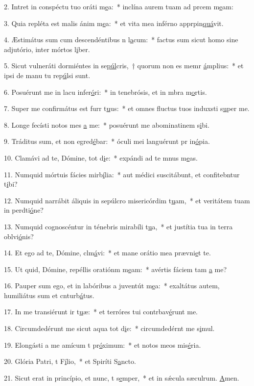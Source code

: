 2. Intret in conspéctu tuo oráti m\uline{e}a:~* inclína aurem tuam ad prcem m\uline{e}am:\par 
3. Quia repléta est malis ánim m\uline{e}a:~* et vita mea inférno apprpin\uline{quá}vit.\par 
4. Æstimátus sum cum descendéntibus n l\uline{a}cum:~* factus sum sicut homo sine adjutório, inter mórtos l\uline{i}ber.\par 
5. Sicut vulneráti dormiéntes in se\uline{púl}cris,~† quorum non es memr \uline{á}mplius:~* et ipsi de manu tu rep\uline{ú}lsi sunt.\par 
6. Posuérunt me in lacu infer\uline{ó}ri:~* in tenebrósis, et in mbra m\uline{o}rtis.\par 
7. Super me confirmátus est furr t\uline{u}us:~* et omnes fluctus tuos induxsti s\uline{u}per me.\par 
8. Longe fecísti notos mes \uline{a} me:~* posuérunt me abominatinem s\uline{i}bi.\par 
9. Tráditus sum, et non egred\uline{é}bar:~* óculi mei languérunt pr in\uline{ó}pia.\par 
10. Clamávi ad te, Dómine, tot d\uline{i}e:~* expándi ad te mnus m\uline{e}as.\par 
11. Numquid mórtuis fácies mirb\uline{í}lia:~* aut médici suscitábunt, et confitebntur t\uline{i}bi?\par 
12. Numquid narrábit áliquis in sepúlcro misericórdim t\uline{u}am,~* et veritátem tuam in perdti\uline{ó}ne?\par 
13. Numquid cognoscéntur in ténebris mirabíli t\uline{u}a,~* et justítia tua in terra oblvi\uline{ó}nis?\par 
14. Et ego ad te, Dómine, clm\uline{á}vi:~* et mane orátio mea prævni\uline{e}t te.\par 
15. Ut quid, Dómine, repéllis oratiónm m\uline{e}am:~* avértis fáciem tam \uline{a} me?\par 
16. Pauper sum ego, et in labóribus a juventút m\uline{e}a:~* exaltátus autem, humiliátus sum et cnturb\uline{á}tus.\par 
17. In me transiérunt ir t\uline{u}æ:~* et terróres tui contrbav\uline{é}runt me.\par 
18. Circumdedérunt me sicut aqua tot d\uline{i}e:~* circumdedérnt me s\uline{i}mul.\par 
19. Elongásti a me amícum t pr\uline{ó}ximum:~* et notos meos  mis\uline{é}ria.\par 
20. Glória Patri, t F\uline{í}lio,~* et Spiríti S\uline{a}ncto.\par 
21. Sicut erat in princípio, et nunc, t s\uline{e}mper,~* et in sǽcula sæculrum. \uline{A}men.\par 
